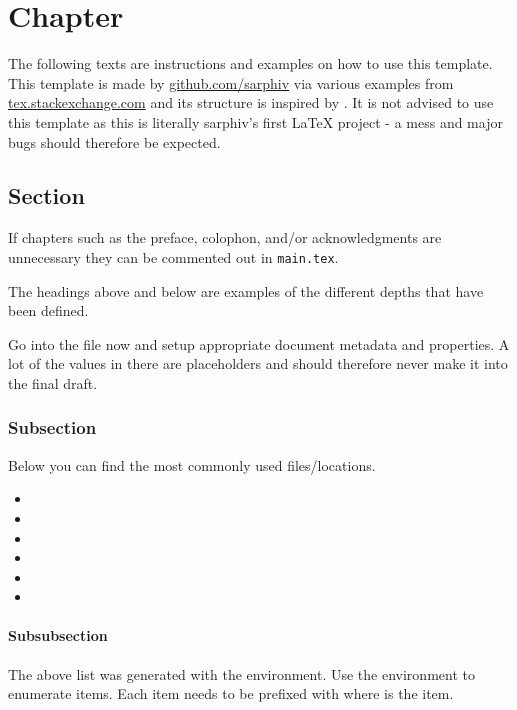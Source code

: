 \chapter{Chapter}
The following texts are instructions and examples on how to use this template.
This template is made by \href{https://github.com/sarphiv/}{github.com/sarphiv} via various examples from \href{https://tex.stackexchange.com}{tex.stackexchange.com}
and its structure is inspired by .
It is not advised to use this template as this is literally sarphiv's first LaTeX project - a mess and major bugs should therefore be expected.

\section{Section}
If chapters such as the preface, colophon, and/or acknowledgments are unnecessary
they can be commented out in \lstinline|main.tex|.

The headings above and below are examples of the different depths that have been defined.

Go into the  file now and setup appropriate document metadata and properties.
A lot of the values in there are placeholders and should therefore never make it into the final draft.

\subsection{Subsection}
Below you can find the most commonly used files/locations.
\begin{itemize}
    \item {}
    \item {}
    \item {}
    \item {}
    \item {}
    \item {}
\end{itemize}

\subsubsection{Subsubsection}
The above list was generated with the  environment.
Use the  environment to enumerate items.
Each item needs to be prefixed with 
where  is the item.

